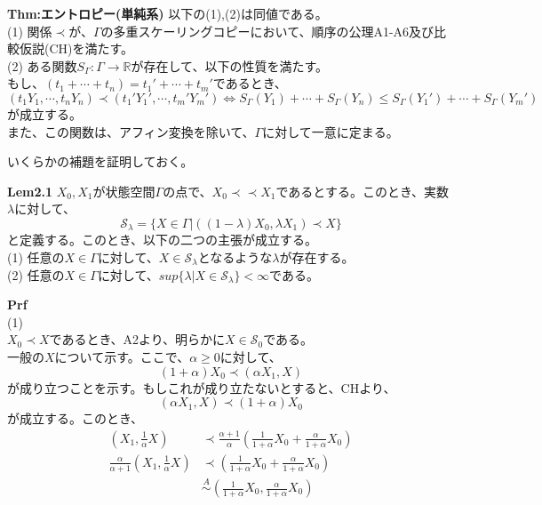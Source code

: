 \documentclass[a4paper,11pt]{jsarticle}
\begin{document}
\begin{itembox}[l]{\textbf{Thm:エントロピー(単純系)}}
    以下の(1),(2)は同値である。\\
    (1) 関係$\prec$が、$\Gamma$の多重スケーリングコピーにおいて、順序の公理A1-A6及び比較仮説(CH)を満たす。\\
    (2) ある関数$S_{\Gamma}:\Gamma \rightarrow \mathbb{R}$が存在して、以下の性質を満たす。\\
    もし、$(t_1+ \cdots +t_n)=t_1'+ \cdots +t_m'$であるとき、
    \begin{equation}
        (t_1 Y_1, \cdots ,t_n Y_n) \prec (t_1' Y_1', \cdots ,t_m' Y_m') \Leftrightarrow S_{\Gamma}(Y_1)+ \cdots +S_{\Gamma}(Y_n) \leq S_{\Gamma}(Y_1')+ \cdots +S_{\Gamma}(Y_m')
    \end{equation}
    が成立する。\\
    また、この関数は、アフィン変換を除いて、$\Gamma$に対して一意に定まる。

\end{itembox}
いくらかの補題を証明しておく。\\
\begin{itembox}[l]{\textbf{Lem2.1}}
$X_0,X_1$が状態空間$\Gamma$の点で、$X_0 \prec \prec X_1$であるとする。このとき、実数$\lambda$に対して、
\begin{equation}
    \mathcal{S}_{\lambda} = \{X\in \Gamma|((1-\lambda)X_0,\lambda X_1) \prec X \}
\end{equation}
と定義する。このとき、以下の二つの主張が成立する。\\
(1) 任意の$X \in \Gamma$に対して、$X \in \mathcal{S}_{\lambda}$となるような$\lambda$が存在する。\\
(2) 任意の$X \in \Gamma$に対して、$sup\{\lambda|X \in \mathcal{S}_{\lambda}\}<\infty$である。

\end{itembox}
\textbf{Prf}\\
(1) \\
$X_0 \prec X$であるとき、A2より、明らかに$X \in \mathcal{S}_0$である。\\
一般の$X$について示す。ここで、$\alpha \geq 0$に対して、
\begin{equation}
    (1+\alpha)X_0 \prec (\alpha X_1,X)
\end{equation}
が成り立つことを示す。もしこれが成り立たないとすると、CHより、
\begin{equation}
    (\alpha X_1,X) \prec (1+\alpha)X_0
\end{equation}
が成立する。このとき、
\begin{align}
    (X_1,\frac{1}{\alpha}X) &\prec \frac{\alpha+1}{\alpha}(\frac{1}{1+\alpha}X_0+\frac{\alpha}{1+\alpha}X_0)\\
    \frac{\alpha}{\alpha+1}(X_1,\frac{1}{\alpha}X) &\prec (\frac{1}{1+\alpha}X_0+\frac{\alpha}{1+\alpha}X_0)\\
    &\overset{A}{\sim} (\frac{1}{1+\alpha}X_0,\frac{\alpha}{1+\alpha}X_0)\\
\end{align}
\end{document}
